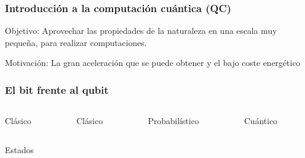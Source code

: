 \documentclass{beamer}
\begin{document}
\begin{frame}
\frametitle{Introducción a la computación cuántica (QC)}
Objetivo: Aprovechar las propiedades de la naturaleza en una escala muy pequeña, 
para realizar computaciones.

\pause

Motivación: La gran aceleración que se puede obtener y el bajo coste energético

\end{frame}
\begin{frame}[t]
\frametitle{El bit frente al qubit}

\begin{columns}
	\begin{column}{0.25\textwidth}
		\center
		Clásico
	\end{column}
	\begin{column}{0.25\textwidth}
		\center
		Clásico
	\end{column}
	\begin{column}{0.25\textwidth}
		\center
		Probabilístico
	\end{column}
	\begin{column}{0.25\textwidth}
		\center
		Cuántico
	\end{column}
\end{columns}

\begin{columns}[c]
	\begin{column}{0.25\textwidth}
		Estados
	\end{column}
	\begin{column}{0.25\textwidth}
		
	\end{column}
	\begin{column}{0.25\textwidth}
		
	\end{column}
	\begin{column}{0.25\textwidth}
		
	\end{column}
\end{columns}


\end{frame}
\end{document}
